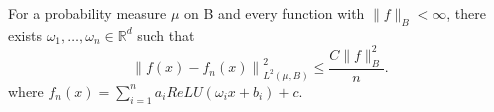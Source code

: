 \begin{theorem}
	For a probability measure $\mu$ on B and every function with $\|f\|_B<\infty$, there exists $\omega_1,\dots,\omega_n\in\mathbb{R}^d$ such that 
	$$
	\left\|f(x)-f_n(x)\right\|^2_{L^2(\mu,B)}\le \frac{C\|f\|^2_B}{n}.
	$$
	where $f_n(x)=\sum_{i=1}^{n}a_iReLU(\omega_i x+b_i)+c$.
\end{theorem}





%
